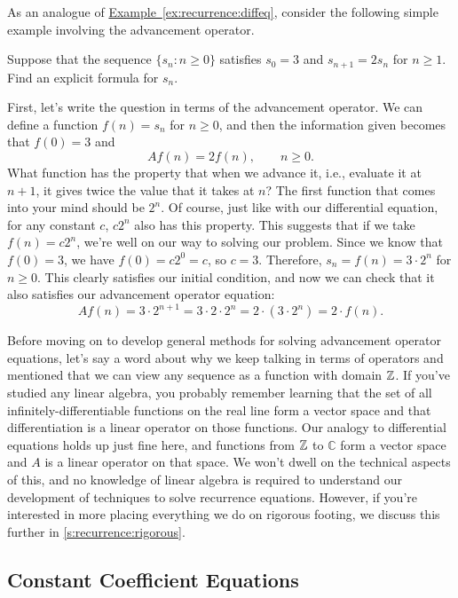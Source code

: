 As an analogue of
\hyperref[ex:recurrence:diffeq]{Example~\ref*{ex:recurrence:diffeq}},
consider the following simple example involving the advancement
operator.

\begin{example}\label{ex:recurrence:adveq}
  Suppose that the sequence $\{s_n\colon n\geq 0\}$ satisfies $s_0 =
  3$ and $s_{n+1} = 2s_{n}$ for $n\geq 1$. Find an explicit formula
  for $s_n$.

  First, let's write the question in terms of the advancement
  operator. We can define a function $f(n) = s_n$ for $n\geq 0$, and
  then the information given becomes that $f(0)=3$ and
  \[Af(n) = 2f(n),\qquad n\geq 0.\]
  What function has the property that when we advance it, i.e.,
  evaluate it at $n+1$, it gives twice the value that it takes at $n$?
  The first function that comes into your mind should be $2^n$. Of
  course, just like with our differential equation, for any constant
  $c$, $c2^n$ also has this property. This suggests that if we take
  $f(n) = c2^n$, we're well on our way to solving our problem. Since
  we know that $f(0) = 3$, we have $f(0) = c2^0 = c$, so $c=
  3$. Therefore, $s_n = f(n) = 3\cdot 2^n$ for $n\geq 0$. This clearly
  satisfies our initial condition, and now we can check that it also
  satisfies our advancement operator equation:
  \[Af(n) = 3\cdot 2^{n+1} = 3\cdot 2\cdot 2^n = 2\cdot (3\cdot 2^n) =
  2\cdot f(n).\]
\end{example}

Before moving on to develop general methods for solving advancement
operator equations, let's say a word about why we keep talking in
terms of operators and mentioned that we can view any sequence as a
function with domain $\mathbb{Z}$. If you've studied any linear algebra, you
probably remember learning that the set of all
infinitely-differentiable functions on the real line form a vector
space and that differentiation is a linear operator on those
functions. Our analogy to differential equations holds up just fine
here, and functions from $\mathbb{Z}$ to $\mathbb{C}$ form a vector space and $A$ is a
linear operator on that space. We won't dwell on the technical aspects
of this, and no knowledge of linear algebra is required to understand
our development of techniques to solve recurrence equations. However,
if you're interested in more placing everything we do on rigorous
footing, we discuss this further in \autoref{s:recurrence:rigorous}.

\subsection{Constant Coefficient Equations}\label{s:recurrence:adv-ops:const-coeff}

